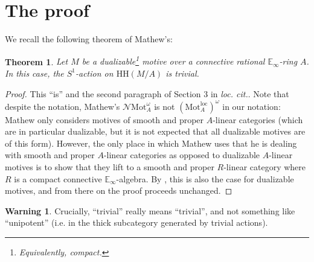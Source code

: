 \documentclass{article}
\newtheorem{thm}{Theorem}[section]
\theoremstyle{definition}
\newtheorem{warn}[warn]{Warning}
\newcommand{\cat}{\mathrm}
\newcommand{\Mot}{\cat{Mot}^{\mathrm{loc}}}
\newcommand{\HH}{\mathrm{HH}}
\begin{document}
\section{The proof}
We recall the following theorem of Mathew's: 
\begin{thm}\label{thm:Akhil}
    Let $M$ be a dualizable\footnote{Equivalently, compact.} motive over a connective rational $\mathbb E_\infty$-ring $A$. In this case, the $S^1$-action on $\HH(M/A)$ is trivial. 
\end{thm}
\begin{proof}
    This ``is'' \cite[Corollary 4.8]{akhil} and the second paragraph of Section 3 in \textit{loc. cit.}. Note that despite the notation, Mathew's $\mathcal N\mathrm{Mot}_A^\omega$ is not $(\Mot_A)^\omega$ in our notation: Mathew only considers motives of smooth and proper $A$-linear categories (which are in particular dualizable, but it is not expected that all dualizable motives are of this form). However, the only place in which Mathew uses that he is dealing with smooth and proper $A$-linear categories as opposed to dualizable $A$-linear motives is to show that they lift to a smooth and proper $R$-linear category where $R$ is a compact connective $\mathbb E_\infty$-algebra. By , this is also the case for dualizable motives, and from there on the proof proceeds unchanged. 
\end{proof}
\begin{warn}
    Crucially, ``trivial'' really means ``trivial'', and not something like ``unipotent'' (i.e. in the thick subcategory generated by trivial actions). 
\end{warn}
\end{document}

